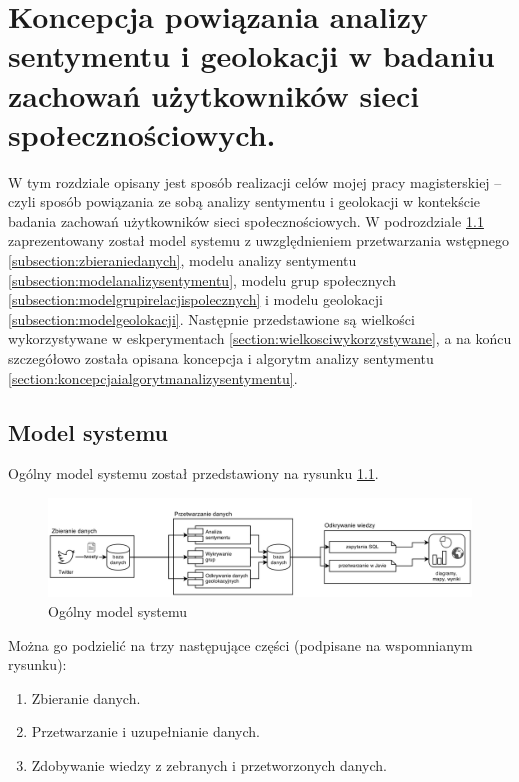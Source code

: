 \chapter{Koncepcja powiązania analizy sentymentu i geolokacji w badaniu
zachowań użytkowników sieci społecznościowych.}

W tym rozdziale opisany jest sposób realizacji celów mojej pracy magisterskiej
-- czyli sposób powiązania ze sobą analizy sentymentu i geolokacji w kontekście
badania zachowań użytkowników sieci społecznościowych. W podrozdziale
\ref{section:modelsystemu} zaprezentowany został model systemu z uwzględnieniem
przetwarzania wstępnego \ref{subsection:zbieraniedanych}, modelu analizy
sentymentu \ref{subsection:modelanalizysentymentu}, modelu grup społecznych
\ref{subsection:modelgrupirelacjispolecznych} i modelu geolokacji
\ref{subsection:modelgeolokacji}. Następnie przedstawione są wielkości
wykorzystywane w eskperymentach \ref{section:wielkosciwykorzystywane}, a na
końcu szczegółowo została opisana koncepcja i algorytm analizy sentymentu
\ref{section:koncepcjaialgorytmanalizysentymentu}.



\section{Model systemu}
\label{section:modelsystemu}
Ogólny model systemu został przedstawiony na rysunku \ref{image:model-systemu}.

\begin{figure}[ht!]
\centering
\includegraphics[width=160mm]{img/gruby-model.png}
\caption{Ogólny model systemu}
\label{image:model-systemu}
\end{figure}


Można go podzielić na trzy następujące części (podpisane na wspomnianym
rysunku):
\begin{enumerate}
  \item Zbieranie danych.
  \item Przetwarzanie i uzupełnianie danych.
  \item Zdobywanie wiedzy z zebranych i przetworzonych danych.
\end{enumerate}



